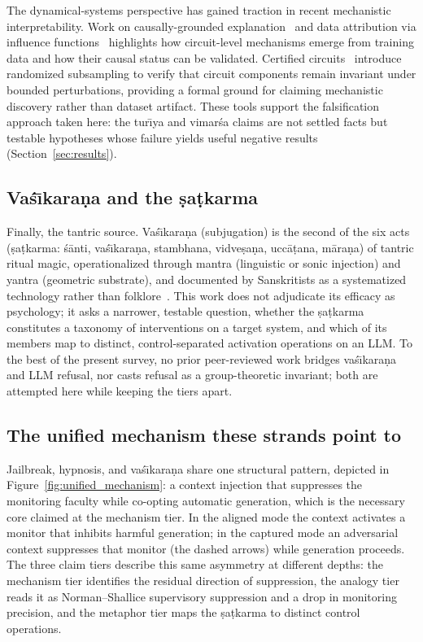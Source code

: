 The dynamical-systems perspective has gained traction in recent mechanistic
interpretability. Work on causally-grounded explanation~\cite{mahale2026causally} and
data attribution via influence functions~\cite{chen2026mechanistic} highlights how
circuit-level mechanisms emerge from training data and how their causal status can be
validated. Certified circuits~\cite{anani2026certified} introduce randomized
subsampling to verify that circuit components remain invariant under bounded
perturbations, providing a formal ground for claiming mechanistic discovery rather
than dataset artifact. These tools support the falsification approach taken here: the
tur\=\i ya and vimarśa claims are not settled facts but testable hypotheses whose
failure yields useful negative results (Section~\ref{sec:results}).

\subsection{Vaś\=\i kara\d{n}a and the \d{s}a\d{t}karma}
Finally, the tantric source. Vaś\=\i kara\d{n}a (subjugation) is the second of the
six acts (\d{s}a\d{t}karma: ś\=anti, vaś\=\i kara\d{n}a, stambhana, vidve\d{s}a\d{n}a,
ucc\=a\d{t}ana, m\=ara\d{n}a) of tantric ritual magic, operationalized through mantra
(linguistic or sonic injection) and yantra (geometric substrate), and documented by
Sanskritists as a systematized technology rather than folklore~\cite{goudriaan1978,turstig1985,buhnemann1988}.
This work does not adjudicate its efficacy as psychology; it asks a narrower, testable
question, whether the \d{s}a\d{t}karma constitutes a taxonomy of interventions
on a target system, and which of its members map to distinct, control-separated
activation operations on an LLM. To the best of the present survey, no prior
peer-reviewed work bridges vaś\=\i kara\d{n}a and LLM refusal, nor casts refusal as a
group-theoretic invariant; both are attempted here while keeping the tiers apart.

\subsection{The unified mechanism these strands point to}
Jailbreak, hypnosis, and vaś\=\i kara\d{n}a share one structural pattern,
depicted in Figure~\ref{fig:unified_mechanism}: a context injection that suppresses
the monitoring faculty while co-opting automatic generation, which is the necessary
core claimed at the mechanism tier. In the aligned mode the context activates a
monitor that inhibits harmful generation; in the captured mode an adversarial context
suppresses that monitor (the dashed arrows) while generation proceeds. The three
claim tiers describe this same asymmetry at different depths: the mechanism tier
identifies the residual direction of suppression, the analogy tier reads it as
Norman--Shallice supervisory suppression and a drop in monitoring precision, and the
metaphor tier maps the \d{s}a\d{t}karma to distinct control operations.

